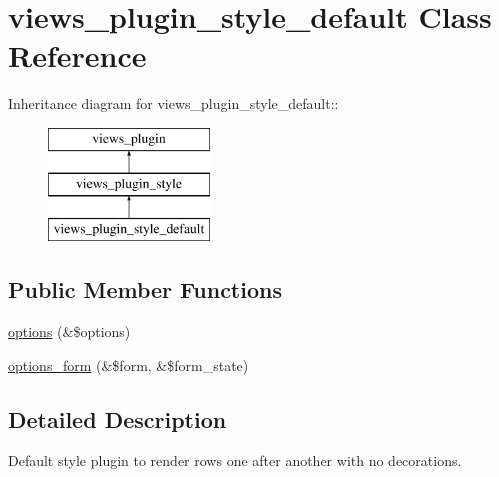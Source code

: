 \hypertarget{classviews__plugin__style__default}{
\section{views\_\-plugin\_\-style\_\-default Class Reference}
\label{classviews__plugin__style__default}
}
Inheritance diagram for views\_\-plugin\_\-style\_\-default::\begin{figure}[H]
\begin{center}
\leavevmode
\includegraphics[height=3cm]{classviews__plugin__style__default}
\end{center}
\end{figure}
\subsection*{Public Member Functions}
\begin{DoxyCompactItemize}
\item 
\hyperlink{classviews__plugin__style__default_adb2765f7fde7c3d8cecaffa3ab660f79}{options} (\&\$options)
\item 
\hyperlink{classviews__plugin__style__default_a6d6eb45c613c5990a44b3071cb82b36d}{options\_\-form} (\&\$form, \&\$form\_\-state)
\end{DoxyCompactItemize}


\subsection{Detailed Description}
Default style plugin to render rows one after another with no decorations. 

